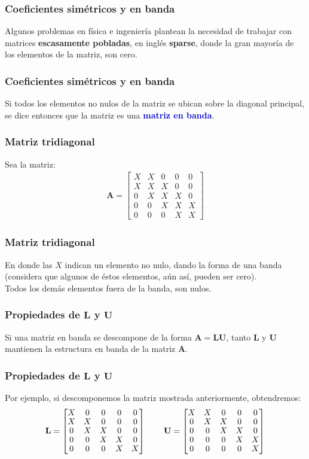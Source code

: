 \documentclass[12pt]{beamer}
\begin{document}
\begin{frame}
\frametitle{Coeficientes simétricos y en banda}
Algunos problemas en física e ingeniería plantean la necesidad de trabajar con matrices \textbf{\textcolor{jade}{escasamente pobladas}}, en inglés \textbf{sparse}, donde la gran mayoría de los elementos de la matriz, son cero.
\end{frame}
\begin{frame}
\frametitle{Coeficientes simétricos y en banda}
Si todos los elementos no nulos de la matriz se ubican sobre la diagonal principal, \pause se dice entonces que la matriz es una \textbf{\textcolor{mediumblue}{matriz en banda}}.
\end{frame}
\begin{frame}
\frametitle{Matriz tridiagonal}
Sea la matriz:
\pause
\begin{align*}
\mathbf{A} = \begin{bmatrix}
X & X & 0 & 0 & 0 \\
X & X & X & 0 & 0 \\
0 & X & X & X & 0 \\
0 & 0 & X & X & X \\
0 & 0 & 0 & X & X
\end{bmatrix}
\end{align*}
\end{frame}
\begin{frame}
\frametitle{Matriz tridiagonal}
En donde las $X$ indican un elemento no nulo, dando la forma de una banda (considera que algunos de éstos elementos, aún así, pueden ser cero).
\\
\bigskip
\pause
Todos los demás elementos fuera de la banda, son nulos.
\end{frame}
\begin{frame}
\frametitle{Propiedades de $\mathbf{L}$ y $\mathbf{U}$}
Si una matriz en banda se descompone de la forma $\mathbf{A} = \mathbf{L} \mathbf{U}$, tanto $\mathbf{L}$ y $\mathbf{U}$ mantienen la estructura en banda de la matriz $\mathbf{A}$.
\end{frame}
\begin{frame}
\frametitle{Propiedades de $\mathbf{L}$ y $\mathbf{U}$}
Por ejemplo, si descomponemos la matriz mostrada anteriormente, obtendremos:
\pause
\begin{align*}
\renewcommand{\arraystretch}{0.9}
\mathbf{L} = \begin{bmatrix}
X & 0 & 0 & 0 & 0 \\
X & X & 0 & 0 & 0 \\
0 & X & X & 0 & 0 \\
0 & 0 & X & X & 0 \\
0 & 0 & 0 & X & X
\end{bmatrix} \hspace{0.75cm}
\mathbf{U} = \begin{bmatrix}
X & X & 0 & 0 & 0 \\
0 & X & X & 0 & 0 \\
0 & 0 & X & X & 0 \\
0 & 0 & 0 & X & X \\
0 & 0 & 0 & 0 & X
\end{bmatrix}
\end{align*}
\end{frame}
\end{document}
